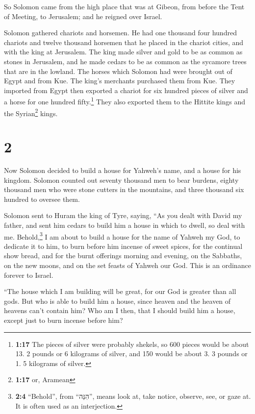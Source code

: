  So Solomon came from the high place that was at Gibeon,
from before the Tent of Meeting, to Jerusalem; and he reigned over
Israel.

 Solomon gathered chariots and horsemen. He had one
thousand four hundred chariots and twelve thousand horsemen that he
placed in the chariot cities, and with the king at Jerusalem.
 The king made silver and gold to be as common as stones
in Jerusalem, and he made cedars to be as common as the sycamore trees
that are in the lowland.  The horses which Solomon had
were brought out of Egypt and from Kue. The king's merchants purchased
them from Kue.  They imported from Egypt then exported a
chariot for six hundred pieces of silver and a horse for one hundred
fifty.\footnote{\textbf{1:17} The pieces of silver were probably
  shekels, so 600 pieces would be about 13. 2 pounds or 6 kilograms of
  silver, and 150 would be about 3. 3 pounds or 1. 5 kilograms of
  silver.} They also exported them to the Hittite kings and the
Syrian\footnote{\textbf{1:17} or, Aramean} kings.

\hypertarget{section-1}{%
\section{2}\label{section-1}}

 Now Solomon decided to build a house for Yahweh's name,
and a house for his kingdom.  Solomon counted out seventy
thousand men to bear burdens, eighty thousand men who were stone cutters
in the mountains, and three thousand six hundred to oversee them.

 Solomon sent to Huram the king of Tyre, saying, ``As you
dealt with David my father, and sent him cedars to build him a house in
which to dwell, so deal with me.  Behold,\footnote{\textbf{2:4}
  ``Behold'', from ``הִנֵּה'', means look at, take notice, observe, see,
  or gaze at. It is often used as an interjection.} I am about to build
a house for the name of Yahweh my God, to dedicate it to him, to burn
before him incense of sweet spices, for the continual show bread, and
for the burnt offerings morning and evening, on the Sabbaths, on the new
moons, and on the set feasts of Yahweh our God. This is an ordinance
forever to Israel.

 ``The house which I am building will be great, for our
God is greater than all gods.  But who is able to build
him a house, since heaven and the heaven of heavens can't contain him?
Who am I then, that I should build him a house, except just to burn
incense before him?

